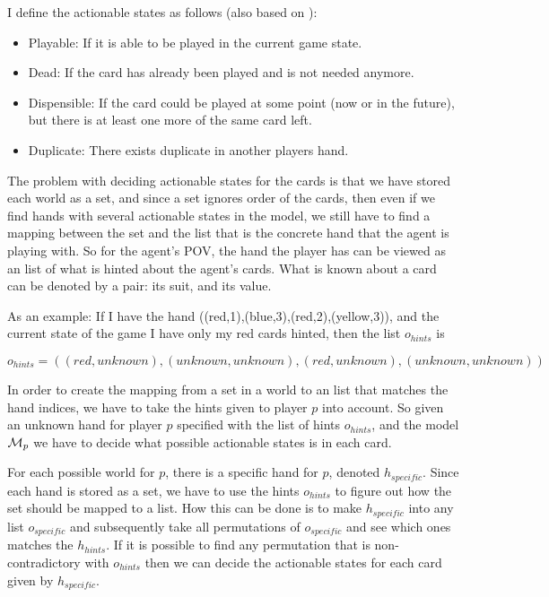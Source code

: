 I define the actionable states as follows (also based on \cite{CoxEtAl2015}):
\begin{itemize}
	\item Playable: If it is able to be played in the current game state.
	\item Dead: If the card has already been played and is not needed anymore.
	\item Dispensible: If the card could be played at some point (now or in the future), but there is at least one more of the same card left.
	\item Duplicate: There exists duplicate in another players hand.
\end{itemize}

The problem with deciding actionable states for the cards is that we have stored each world as a set, and since a set ignores order of the cards, then even if we find hands with several actionable states in the model, we still have to find a mapping between the set and the list that is the concrete hand that the agent is playing with.
So for the agent's POV, the hand the player has can be viewed as an list of what is hinted about the agent's cards. What is known about a card can be denoted by a pair: its suit, and its value. 

As an example: If I have the hand ((red,1),(blue,3),(red,2),(yellow,3)), and the current state of the game I have only my red cards hinted, then the list $o_{hints}$ is

\[o_{hints} = ((red,unknown),(unknown,unknown),(red,unknown),(unknown,unknown))\]


In order to create the mapping from a set in a world to an list that matches the hand indices, we have to take the hints given to player $p$ into account.
So given an unknown hand for player $p$ specified with the list of hints $o_{hints}$, and the model $\mathcal{M}_p$ we have to decide what possible actionable states is in each card. 

For each possible world for $p$, there is a specific hand for $p$, denoted $h_{specific}$. Since each hand is stored as a set, we have to use the hints $o_{hints}$ to figure out how the set should be mapped to a list. How this can be done is to make $h_{specific}$ into any list $o_{specific}$ and subsequently take all permutations of $o_{specific}$ and see which ones matches the $h_{hints}$. If it is possible to find any permutation that is non-contradictory with $o_{hints}$ then we can decide the actionable states for each card given by $h_{specific}$.

